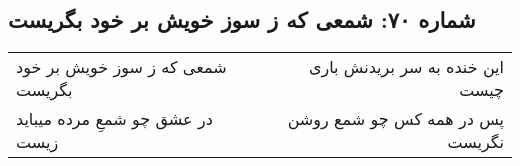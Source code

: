 \begin{center}
\section*{شماره ۷۰: شمعی که ز سوز خویش بر خود بگریست}
\label{sec:070}
\begin{longtable}{l p{0.5cm} r}
شمعی که ز سوز خویش بر خود بگریست
&&
این خنده به سر بریدنش باری چیست
\\
در عشق چو شمعِ مرده میباید زیست
&&
پس در همه کس چو شمع روشن نگریست
\\
\end{longtable}
\end{center}
